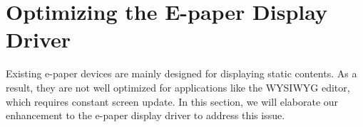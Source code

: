 \documentclass[]{sigchi}
\begin{document}











\section{Optimizing the E-paper Display Driver}\label{sect:os}
Existing e-paper devices are mainly designed for displaying static contents. As a result, they are not well optimized for applications like the WYSIWYG editor, which requires constant screen update. In this section, we will elaborate our enhancement to the e-paper display driver to address this issue. 
\end{document}

